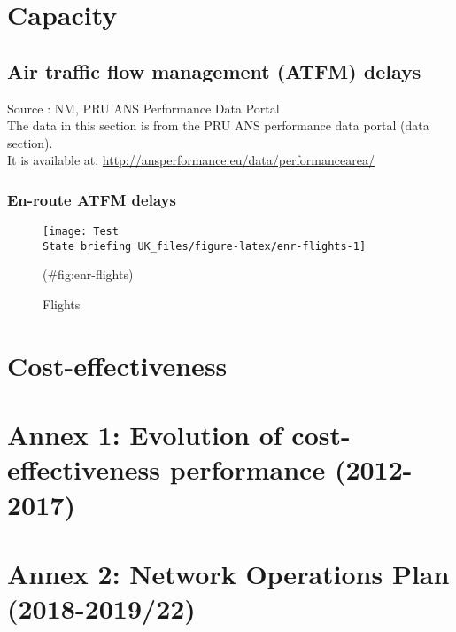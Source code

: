 \documentclass[]{book}
\begin{document}
\hypertarget{capacity-1}{%
\chapter{Capacity}\label{capacity-1}}

\hypertarget{air-traffic-flow-management-atfm-delays}{%
\section{Air traffic flow management (ATFM) delays}\label{air-traffic-flow-management-atfm-delays}}

Source : NM, PRU ANS Performance Data Portal\\
The data in this section is from the PRU ANS performance data portal (data section).\\
It is available at: \url{http://ansperformance.eu/data/performancearea/}

\hypertarget{en-route-atfm-delays-1}{%
\subsection{En-route ATFM delays}\label{en-route-atfm-delays-1}}

\begin{figure}

{\centering \texttt{[image: Test\\State briefing UK\_files/figure-latex/enr-flights-1]} 

}

\caption{Flights}(\#fig:enr-flights)
\end{figure}

\hypertarget{cost-effectiveness-1}{%
\chapter{Cost-effectiveness}\label{cost-effectiveness-1}}

\hypertarget{annex-1-evolution-of-cost-effectiveness-performance-2012-2017}{%
\chapter{Annex 1: Evolution of cost-effectiveness performance (2012-2017)}\label{annex-1-evolution-of-cost-effectiveness-performance-2012-2017}}

\hypertarget{annex-2-network-operations-plan-2018-201922}{%
\chapter{Annex 2: Network Operations Plan (2018-2019/22)}\label{annex-2-network-operations-plan-2018-201922}}
\end{document}

